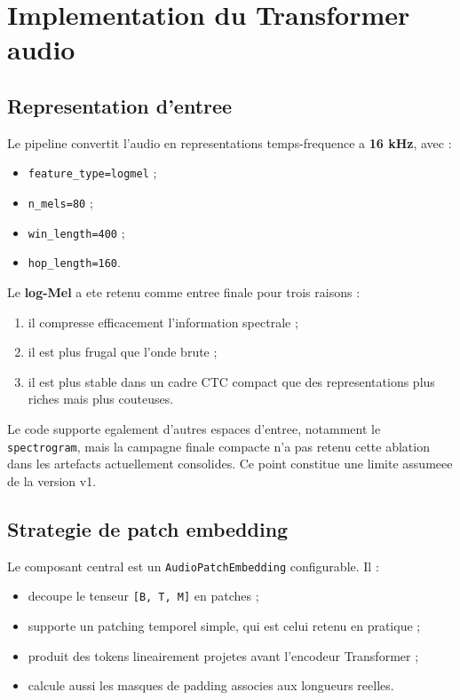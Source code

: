 \documentclass[11pt,a4paper]{article}
\begin{document}
\section{Implementation du Transformer audio}
\subsection{Representation d'entree}
Le pipeline convertit l'audio en representations temps-frequence a \textbf{16 kHz}, avec :
\begin{itemize}[leftmargin=1.2cm]
\item \texttt{feature\_type=logmel} ;
\item \texttt{n\_mels=80} ;
\item \texttt{win\_length=400} ;
\item \texttt{hop\_length=160}.
\end{itemize}

Le \textbf{log-Mel} a ete retenu comme entree finale pour trois raisons :
\begin{enumerate}[leftmargin=1.2cm]
\item il compresse efficacement l'information spectrale ;
\item il est plus frugal que l'onde brute ;
\item il est plus stable dans un cadre CTC compact que des representations plus riches mais plus couteuses.
\end{enumerate}

Le code supporte egalement d'autres espaces d'entree, notamment le \texttt{spectrogram}, mais la campagne finale compacte n'a pas retenu cette ablation dans les artefacts actuellement consolides. Ce point constitue une limite assumeee de la version v1.

\subsection{Strategie de patch embedding}
Le composant central est un \texttt{AudioPatchEmbedding} configurable. Il :
\begin{itemize}[leftmargin=1.2cm]
\item decoupe le tenseur \texttt{[B, T, M]} en patches ;
\item supporte un patching temporel simple, qui est celui retenu en pratique ;
\item produit des tokens lineairement projetes avant l'encodeur Transformer ;
\item calcule aussi les masques de padding associes aux longueurs reelles.
\end{itemize}
\end{document}

